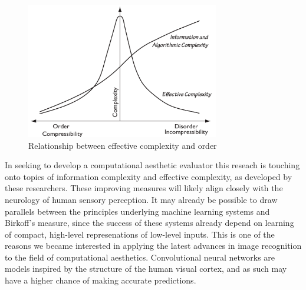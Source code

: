 \documentclass[midd]{thesis}
\begin{document}
\begin{figure}
\centering
\includegraphics[width=0.75\textwidth]{figures/effectivecomplexity.pdf}
\caption{Relationship between effective complexity and order}
\label{fig:effectivecomplexity}
\end{figure}

In seeking to develop a computational aesthetic evaluator this reseach is touching onto topics of information complexity and effective complexity, as developed by these researchers. These improving measures will likely align closely with the neurology of human sensory perception. It may already be possible to draw parallels between the principles underlying machine learning systems and Birkoff's measure, since the success of these systems already depend on learning of compact, high-level represenations of low-level inputs. This is one of the reasons we became interested in applying the latest advances in image recognition to the field of computational aesthetics. Convolutional neural networks are models inspired by the structure of the human visual cortex, and as such may have a higher chance of making accurate predictions.
\end{document}
